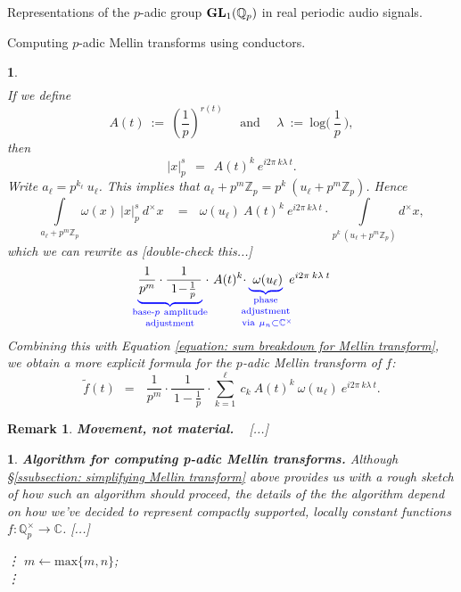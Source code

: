 \documentclass[letterpaper,11pt, reqno]{amsart}
\newtheorem{monodromy theorem}{Monodromy Theorem}[subsection]
\newtheorem{wild conjecture}[theorem]{Wild Conjecture}
\newtheorem{research objectives}{Research objectives}[subsection]
\newtheorem{research question}[theorem]{Research questions}
\newtheorem{aside question}[theorem]{Aside question}
\newtheorem{audio example}[theorem]{\loudspeaker[3] Example}
\newtheorem{blank remark}[theorem]{}
\newtheorem{ssubsection}[theorem]{}
\newtheorem{terminology and comment}[theorem]{Terminology and comment}
\newtheorem{purity hypothesis}[theorem]{Purity hypothesis}
\newtheorem{corollary of the purity hypothesis}[theorem]{Corollary of the purity hypothesis}
\newtheorem{rem1}[theorem]{Remark}
\newenvironment{remark}{\begin{rem1}\em}{\end{rem1}}
\newcommand{\CC} {{\mathbb C}}
\newcommand{\QQ} {{\mathbb Q}}
\newcommand{\ZZ} {{\mathbb Z}}
\newcommand{\lra}{{\longrightarrow}}
\numberwithin{equation}{theorem}
\begin{document}
\begin{section}{Representations of the $p$-adic group $\bold{GL}_{1}(\mathbb{Q}_{p})$
in real periodic audio signals.}
\begin{subsection}{Computing $p$-adic Mellin transforms using conductors.}
\begin{ssubsection}
$$\begin{array}{rcl}
	\end{array}
	$$
If we define
	$$
	A(t)
	\ :=\ 
	\left(\frac{1}{p}\right)^{\!\!r(t)}
	\ \ \ \ \ \ \text{and}\ \ \ \ \ \ 
	\lambda
	\ :=\ 
	\text{log}\Big(\ \!\frac{1}{p}\ \!\Big),
	$$
then
	$$
	|x|^{s}_p
	\ \ =\ \ 
	A(t)^k\ e^{i2\pi\ \!k\lambda\ \!t}.
	$$
Write $a_\ell=p^{k_\ell}\ \!u_\ell$. This implies that $a_\ell+p^m\ZZ_p=p^k\ \!(u_\ell+p^m\ZZ_p)$. Hence
	$$
	\underset{{a_\ell+p^m\ZZ_p}}{\int}
	\!\!\!\!\!\omega(x)\ |x|^{s}_{p}\ d^\times\!x
	\ \ \ \ =\ \ \ 
	\omega(u_\ell)\ A(t)^k\ e^{i2\pi\ \!k\lambda\ \!t}\cdot
	\!\!\!\!\!\!\!
	\underset{p^k\ \!(u_\ell+p^m\ZZ_p)}{\int}
	\!\!\!\!\!\!d^\times\!x,
	$$
which we can rewrite as {\color{red} [double-check this...]}
	$$
	{\color{blue}
	\underset{\text{adjustment}}{
	\underset{\text{base-}p\ \text{amplitude}}{
	\underbrace{
	{\color{black}
	\frac{1}{p^m}\cdot\frac{1}{\ 1\!-\!\tfrac{1}{p}\ }
	}}}}\!
	{\color{black} \cdot\ A(t)^k\cdot}
	\underset{\!\!\!\text{via}\ \mu_n\subset\CC^\times\!\!\!\!\!}{
	\underset{\!\!\!\text{adjustment}\!\!\!}{
	\underset{\text{phase}}{
	\underbrace{
	{\color{black}
	\ \omega(u_\ell)}
	}}}}}
	{\color{black} \ e^{i2\pi\ \!k\lambda\ \!t}
	}
	$$
Combining this with Equation \eqref{equation: sum breakdown for Mellin transform}, we obtain a more explicit formula for the $p$-adic Mellin transform of $f$:
	\begin{equation}\label{equation: an explicit formula for Mellin transform}
	\widetilde{f}(t)
	\ \ =\ \ \ 
	\frac{1}{p^m}\cdot\frac{1}{\ 1\!-\!\tfrac{1}{p}\ }\cdot
	\sum^{\ell}_{k=1}\ c_{k}
	\ A(t)^k\ \omega(u_\ell)\ e^{i2\pi\ \!k\lambda\ \!t}.
	\end{equation}
\end{ssubsection}

\begin{remark}
{\bf Movement, not material.}
\ {\color{red} [...]}
\end{remark}

\begin{ssubsection}{{\bf Algorithm for computing {\em p}-adic Mellin transforms.}}
\normalfont
Although \S\ref{ssubsection: simplifying Mellin transform} above provides us with a rough sketch of how such an algorithm should proceed, the details of the the algorithm depend on how we've decided to represent compactly supported, locally constant functions $f:\QQ^\times_{p}\lra\CC$.
{\color{red} [...]}
\begin{algorithm}
\caption{Compute $p$-adic Mellin transform $\int_{\QQ^\times_p}f(x)\ \omega(x)\ |x|^{s}_{p}\ d^\times\!x$ as a function of $s\in\CC_{\text{Re}\ge0}$.}
\vdots
$m\longleftarrow \text{max}\{m,n\}$;
\\ 
\vdots
\end{algorithm}


\end{ssubsection}
\end{subsection}
\end{section}
\end{document}
